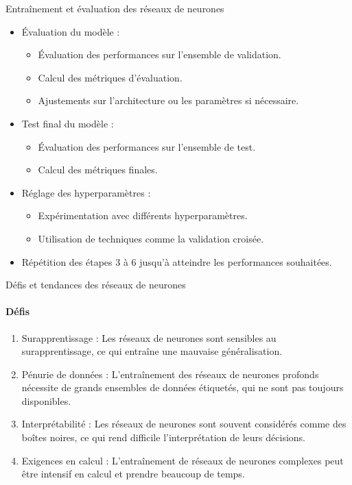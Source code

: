 \documentclass{beamer}
\begin{document}

\begin{frame}{Entraînement et évaluation des réseaux de neurones }
	\begin{itemize}
		
		\item Évaluation du modèle :
		\begin{itemize}
			\item Évaluation des performances sur l'ensemble de validation.
			\item Calcul des métriques d'évaluation.
			\item Ajustements sur l'architecture ou les paramètres si nécessaire.
		\end{itemize}
		
		\item Test final du modèle :
		\begin{itemize}
			\item Évaluation des performances sur l'ensemble de test.
			\item Calcul des métriques finales.
		\end{itemize}
		
		\item Réglage des hyperparamètres :
		\begin{itemize}
			\item Expérimentation avec différents hyperparamètres.
			\item Utilisation de techniques comme la validation croisée.
		\end{itemize}
		
		\item Répétition des étapes 3 à 6 jusqu'à atteindre les performances souhaitées.
	\end{itemize}
\end{frame}

\begin{frame}{Défis et tendances des réseaux de neurones}
	\framesubtitle{Défis}
	\begin{enumerate}
		\item Surapprentissage : Les réseaux de neurones sont sensibles au surapprentissage, ce qui entraîne une mauvaise généralisation.
		\item Pénurie de données : L'entraînement des réseaux de neurones profonds nécessite de grands ensembles de données étiquetés, qui ne sont pas toujours disponibles.
		\item Interprétabilité : Les réseaux de neurones sont souvent considérés comme des boîtes noires, ce qui rend difficile l'interprétation de leurs décisions.
		\item Exigences en calcul : L'entraînement de réseaux de neurones complexes peut être intensif en calcul et prendre beaucoup de temps.
	\end{enumerate}
\end{frame}
\end{document}
